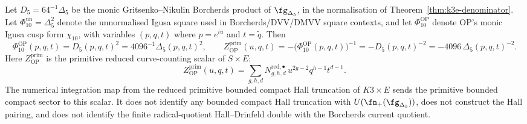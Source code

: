 \begin{proposition}
\label{gluing:thm:quasi-nccr-positive-half-Phi10}
Let \(D_5=64^{-1}\Delta_5\) be the monic Gritsenko--Nikulin
Borcherds product of \(\fg_{\Delta_5}\), in the normalisation of
Theorem~\ref{thm:k3e-denominator}. Let
\(\Phi_{10}^{\mathrm{un}}=\Delta_5^2\) denote the unnormalised Igusa
square used in Borcherds/DVV/DMVV square contexts, and let
\(\Phi_{10}^{\mathrm{OP}}\) denote OP's monic Igusa cusp form
\(\chi_{10}\), with variables \((p,q,t)\) where \(p=e^{iu}\) and
\(t=\tilde q\). Then
\[
 \Phi_{10}^{\mathrm{OP}}(p,q,t)=D_5(p,q,t)^2
 =4096^{-1}\Delta_5(p,q,t)^2,
 \qquad
 Z^{\mathrm{prim}}_{\mathrm{OP}}(u,q,t)
 =-\bigl(\Phi_{10}^{\mathrm{OP}}(p,q,t)\bigr)^{-1}
 =-D_5(p,q,t)^{-2}
 =-4096\,\Delta_5(p,q,t)^{-2}.
\]
Here \(Z^{\mathrm{prim}}_{\mathrm{OP}}\) is the primitive reduced
curve-counting scalar of \(S\times E\):
\[
 Z^{\mathrm{prim}}_{\mathrm{OP}}(u,q,t)
 =
 \sum_{g,h,d}
 N^{\mathrm{red},\bullet}_{g,h,d}\,
 u^{2g-2}q^{h-1}t^{d-1}.
\]
The numerical integration map from the reduced primitive bounded compact
Hall truncation of \(K3\times E\) sends the primitive bounded compact
sector to this scalar. It does not identify any bounded compact Hall truncation with
\(U(\fn_+(\fg_{\Delta_5}))\), does not construct the Hall pairing, and
does not identify the finite radical-quotient Hall--Drinfeld double
with the Borcherds current quotient.
\end{proposition}

